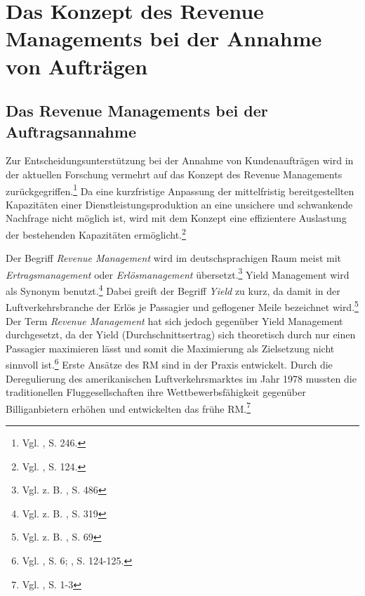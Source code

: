 \chapter{Das Konzept des Revenue Managements bei der Annahme von Aufträgen}
\setcounter{footnote}{4}  %


\section{Das Revenue Managements bei der Auftragsannahme}
Zur Entscheidungsunterstützung bei der Annahme von Kundenaufträgen wird in der aktuellen Forschung vermehrt auf das Konzept des Revenue Managements zurückgegriffen.\footnote{Vgl. \cite{klein2001revenue}, S. 246.} Da eine kurzfristige Anpassung der mittelfristig bereitgestellten Kapazitäten einer Dienstleistungsproduktion an eine unsichere und schwankende Nachfrage nicht möglich ist, wird mit dem Konzept eine effizientere Auslastung der bestehenden Kapazitäten ermöglicht.\footnote{Vgl. \cite{ing2005revenue}, S. 124.}

Der Begriff \textit{Revenue Management} wird im deutschsprachigen Raum meist mit \textit{Ertrags}\-\textit{management} oder \textit{Erlösmanagement} übersetzt.\footnote{Vgl. z. B. \cite{zehle1991yield}, S. 486} Yield Management wird als Synonym benutzt.\footnote{Vgl. z. B. \cite{kolisch2006revenue}, S. 319} Dabei greift der Begriff \textit{Yield} zu kurz, da damit in der Luftverkehrsbranche der Erlös je Passagier und geflogener Meile bezeichnet wird.\footnote{Vgl. z. B. \cite{weatherford1998tutorial}, S. 69} Der Term \textit{Revenue Management} hat sich jedoch gegenüber Yield Management durchgesetzt, da der Yield (Durchschnittsertrag) sich theoretisch durch nur einen Passagier maximieren lässt und somit die Maximierung als Zielsetzung nicht sinnvoll ist.\footnote{Vgl. \cite{Klein:2008aa}, S. 6; \cite{ing2005revenue}, S. 124-125.} Erste Ansätze des RM sind in der Praxis entwickelt. Durch die Deregulierung des amerikanischen Luftverkehrsmarktes im Jahr 1978 mussten die traditionellen Fluggesellschaften ihre Wettbewerbsfähigkeit gegenüber Billiganbietern erhöhen und entwickelten das frühe RM.\footnote{Vgl. \cite{Petrick:2009aa}, S. 1-3}

